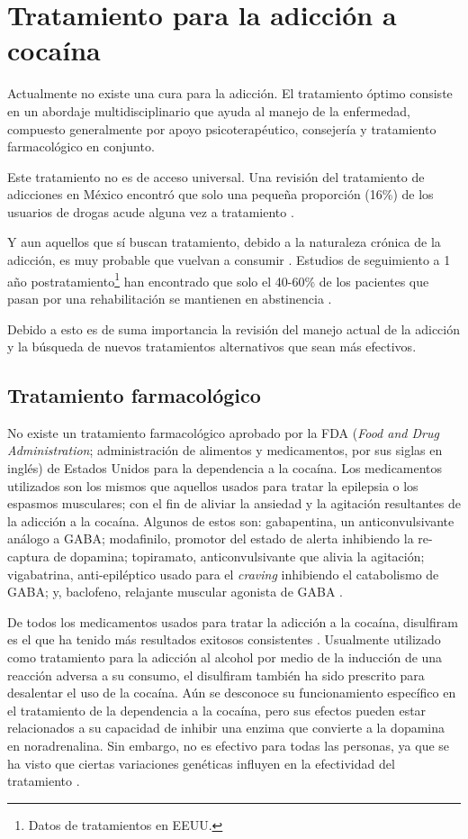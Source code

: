 \section{Tratamiento para la adicción a cocaína}
Actualmente no existe una cura para la adicción.
El tratamiento óptimo consiste en un abordaje multidisciplinario que ayuda al manejo de la enfermedad, compuesto generalmente por apoyo psicoterapéutico, consejería y tratamiento farmacológico en conjunto. \par
Este tratamiento no es de acceso universal. Una revisión del tratamiento de adicciones en México encontró que solo una pequeña proporción (16\%) de los usuarios de drogas acude alguna vez a tratamiento \parencite{Rojas2011}.\par
Y aun aquellos que sí buscan tratamiento, debido a la naturaleza crónica de la adicción, es muy probable que vuelvan a consumir \parencite{NIDA.}.
Estudios de seguimiento a 1 año postratamiento\footnote{Datos de tratamientos en EEUU.} han encontrado que solo el 40-60\% de los pacientes que pasan por una rehabilitación se mantienen en abstinencia \parencite{McLellan2000a}.\par
Debido a esto es de suma importancia la revisión del manejo actual de la adicción y la búsqueda de nuevos tratamientos alternativos que sean más efectivos.

\subsection{Tratamiento farmacológico}
No existe un tratamiento farmacológico aprobado por la FDA (\textit{Food and Drug Administration}; administración de alimentos y medicamentos, por sus siglas en inglés) de Estados Unidos para la dependencia a la cocaína.
Los medicamentos utilizados son los mismos que aquellos usados para tratar la epilepsia o los espasmos musculares; con el fin de aliviar la ansiedad y la agitación resultantes de la adicción a la cocaína.
Algunos de estos son: gabapentina, un anticonvulsivante análogo a GABA; modafinilo, promotor del estado de alerta inhibiendo la re-captura de dopamina; topiramato, anticonvulsivante que alivia la agitación; vigabatrina, anti-epiléptico usado para el \textit{craving} inhibiendo el catabolismo de GABA; y, baclofeno, relajante muscular agonista de GABA \parencite{Volkow2007b}.\par
De todos los medicamentos usados para tratar la adicción a la cocaína, disulfiram es el que ha tenido más resultados exitosos consistentes \parencite{Volkow2007b}.
Usualmente utilizado como tratamiento para la adicción al alcohol por medio de la inducción de una reacción adversa a su consumo, el disulfiram también ha sido prescrito para desalentar el uso de la cocaína.
Aún se desconoce su funcionamiento específico en el tratamiento de la dependencia a la cocaína, pero sus efectos pueden estar relacionados a su capacidad de inhibir una enzima que convierte a la dopamina en noradrenalina.
Sin embargo, no es efectivo para todas las personas, ya que se ha visto que ciertas variaciones genéticas influyen en la efectividad del tratamiento \parencite{Gaval-Cruz2009a, Volkow2007b}.

